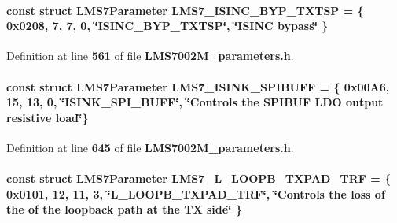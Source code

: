 \paragraph[{L\+M\+S7\+\_\+\+I\+S\+I\+N\+C\+\_\+\+B\+Y\+P\+\_\+\+T\+X\+T\+SP}]{\setlength{\rightskip}{0pt plus 5cm}const struct {\bf L\+M\+S7\+Parameter} L\+M\+S7\+\_\+\+I\+S\+I\+N\+C\+\_\+\+B\+Y\+P\+\_\+\+T\+X\+T\+SP = \{ 0x0208, 7, 7, 0, \char`\"{}\+I\+S\+I\+N\+C\+\_\+\+B\+Y\+P\+\_\+\+T\+X\+T\+S\+P\char`\"{}, \char`\"{}\+I\+S\+I\+N\+C bypass\char`\"{} \}\hspace{0.3cm}{\ttfamily [static]}}\label{LMS7002M__parameters_8h_ac90bc3d79326fe37ef8c498cca8e0c46}


Definition at line {\bf 561} of file {\bf L\+M\+S7002\+M\+\_\+parameters.\+h}.

\paragraph[{L\+M\+S7\+\_\+\+I\+S\+I\+N\+K\+\_\+\+S\+P\+I\+B\+U\+FF}]{\setlength{\rightskip}{0pt plus 5cm}const struct {\bf L\+M\+S7\+Parameter} L\+M\+S7\+\_\+\+I\+S\+I\+N\+K\+\_\+\+S\+P\+I\+B\+U\+FF = \{ 0x00\+A6, 15, 13, 0, \char`\"{}\+I\+S\+I\+N\+K\+\_\+\+S\+P\+I\+\_\+\+B\+U\+F\+F\char`\"{}, \char`\"{}\+Controls the S\+P\+I\+B\+U\+F L\+D\+O output resistive load\char`\"{}\}\hspace{0.3cm}{\ttfamily [static]}}\label{LMS7002M__parameters_8h_a4c8d3ff8ab2220e83a549e62aacb551f}


Definition at line {\bf 645} of file {\bf L\+M\+S7002\+M\+\_\+parameters.\+h}.

\paragraph[{L\+M\+S7\+\_\+\+L\+\_\+\+L\+O\+O\+P\+B\+\_\+\+T\+X\+P\+A\+D\+\_\+\+T\+RF}]{\setlength{\rightskip}{0pt plus 5cm}const struct {\bf L\+M\+S7\+Parameter} L\+M\+S7\+\_\+\+L\+\_\+\+L\+O\+O\+P\+B\+\_\+\+T\+X\+P\+A\+D\+\_\+\+T\+RF = \{ 0x0101, 12, 11, 3, \char`\"{}\+L\+\_\+\+L\+O\+O\+P\+B\+\_\+\+T\+X\+P\+A\+D\+\_\+\+T\+R\+F\char`\"{}, \char`\"{}\+Controls the loss of the of the loopback path at the T\+X side\char`\"{} \}\hspace{0.3cm}{\ttfamily [static]}}\label{LMS7002M__parameters_8h_ac747bb3dc245b3b9152afbe8e6b8d670}


